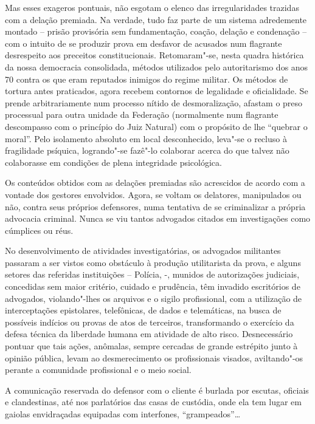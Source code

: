 Mas esses exageros pontuais, não esgotam o elenco das irregularidades
trazidas com a delação premiada. Na verdade, tudo faz parte de um
sistema adredemente montado -- prisão provisória sem fundamentação,
coação, delação e condenação -- com o intuito de se produzir prova em
desfavor de acusados num flagrante desrespeito aos preceitos
constitucionais. Retomaram"-se, nesta quadra histórica da nossa
democracia consolidada, métodos utilizados pelo autoritarismo dos anos
70 contra os que eram reputados inimigos do regime militar. Os métodos
de tortura antes praticados, agora recebem contornos de legalidade e
oficialidade. Se prende arbitrariamente num processo nítido de
desmoralização, afastam o preso processual para outra unidade da
Federação (normalmente num flagrante descompasso com o princípio do Juiz
Natural) com o propósito de lhe ``quebrar o moral''. Pelo isolamento
absoluto em local desconhecido, leva"-se o recluso à fragilidade
psíquica, logrando"-se fazê"-lo colaborar acerca do que talvez não
colaborasse em condições de plena integridade psicológica.

Os conteúdos obtidos com as delações premiadas são acrescidos de acordo
com a vontade dos gestores envolvidos. Agora, se voltam os delatores,
manipulados ou não, contra seus próprios defensores, numa tentativa de
se criminalizar a própria advocacia criminal. Nunca se viu tantos
advogados citados em investigações como cúmplices ou réus.

No desenvolvimento de atividades investigatórias, os advogados
militantes passaram a ser vistos como obstáculo à produção utilitarista
da prova, e alguns setores das referidas instituições -- Polícia,  -,
munidos de autorizações judiciais, concedidas sem maior critério,
cuidado e prudência, têm invadido escritórios de advogados,
violando"-lhes os arquivos e o sigilo profissional, com a utilização de
interceptações epistolares, telefônicas, de dados e telemáticas, na
busca de possíveis indícios ou provas de atos de terceiros,
transformando o exercício da defesa técnica da liberdade humana em
atividade de alto risco. Desnecessário pontuar que tais ações, anômalas,
sempre cercadas de grande estrépito junto à opinião pública, levam ao
desmerecimento os profissionais visados, aviltando"-os perante a
comunidade profissional e o meio social.

A comunicação reservada do defensor com o cliente é burlada por escutas,
oficiais e clandestinas, até nos parlatórios das casas de custódia, onde
ela tem lugar em gaiolas envidraçadas equipadas com interfones,
``grampeados''\ldots{}

